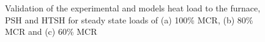 \documentclass[review]{elsarticle}
\begin{document}
\begin{figure}\label{fig_heat_valid}
\caption{Validation of the experimental and models heat load to the furnace, PSH and HTSH for steady state loads of (a) 100\% MCR, (b) 80\% MCR and (c) 60\% MCR}
\end{figure}
\end{document}
